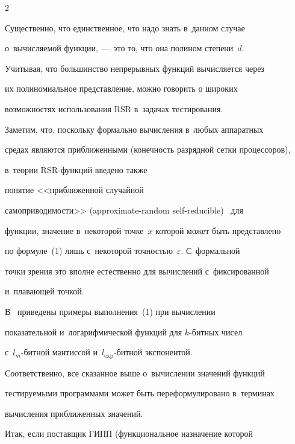 \begin{multicols}{2}
    


    Существенно, что единственное, что надо знать в~данном случае 


о~вычисляемой функции,~--- это то, что она полином степени~$d$.


    


    Учитывая, что большинство непрерывных функций вычисляется через 


их полиномиальное представление, можно говорить о широких 


возможностях использования RSR в~задачах тестирования.


    


    Заметим, что, поскольку формально вычисления в~любых аппаратных 


средах являются при\-ближенными (конечность разрядной сетки про\-цессоров), 


в~теории RSR-функ\-ций введено также\linebreak


 понятие <<приближенной случайной 


самоприводимости>> (approximate-random self-reducible)~\cite{12-bf} для 


функции, значение в~некоторой точке~$x$ которой может быть представлено 


по формуле~(1) лишь с~некоторой точностью~$\varepsilon$. С~формальной 


точки зрения это вполне естественно для вычислений с~фиксированной 


и~плавающей точкой.





    В~\cite{12-bf} приведены примеры выполнения~(1) при вычислении 


показательной и~логарифмической функций для $k$-бит\-ных чисел  


с~$l_m$-бит\-ной мантиссой и~$l_{\mathrm{exp}}$-бит\-ной экспонентой.


    


    Соответственно, все сказанное выше о~вы\-чис\-ле\-нии значений функций 


тестируемыми программами может быть переформулировано в~терминах 


вычисления приближенных значений.


    


    Итак, если поставщик ГИПП (функциональное назначение которой 



\end{multicols}
